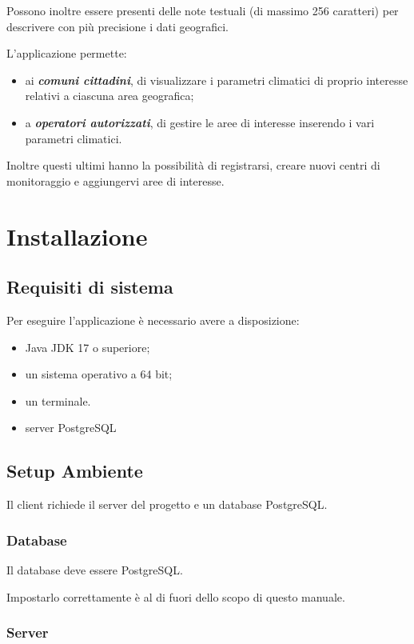 Possono inoltre essere presenti delle note testuali (di massimo 256 caratteri) per descrivere con più precisione i dati geografici.

L'applicazione permette:
\begin{itemize}
	\item ai \textbf{\textsl{comuni cittadini}}, di visualizzare i parametri climatici di proprio interesse relativi a ciascuna area geografica;
	\item a \textbf{\textsl{operatori autorizzati}}, di gestire le aree di interesse inserendo i vari parametri climatici.
\end{itemize}
Inoltre questi ultimi hanno la possibilit\`a di registrarsi, creare nuovi centri di monitoraggio e aggiungervi aree di interesse.

\pagebreak

\chapter{Installazione}
\section{Requisiti di sistema}
Per eseguire l’applicazione \`e necessario avere a disposizione:
\begin{itemize}
	\item Java JDK 17 o superiore;
	\item un sistema operativo a 64 bit;
	\item un terminale.
	\item server PostgreSQL
\end{itemize}

\section{Setup Ambiente}

Il client richiede il server del progetto e un database PostgreSQL.

\subsection{Database}

Il database deve essere PostgreSQL.

Impostarlo correttamente è al di fuori dello scopo di questo manuale.

\subsection{Server}

